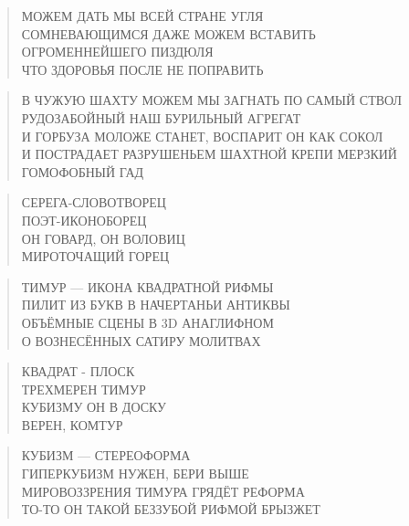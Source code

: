 \poemtitle{***}
\begin{verse}
МОЖЕМ ДАТЬ МЫ ВСЕЙ СТРАНЕ УГЛЯ\\
СОМНЕВАЮЩИМСЯ ДАЖЕ МОЖЕМ ВСТАВИТЬ\\
ОГРОМЕННЕЙШЕГО ПИЗДЮЛЯ\\
ЧТО ЗДОРОВЬЯ ПОСЛЕ НЕ ПОПРАВИТЬ
\end{verse}

\poemtitle{***}
\begin{verse}
В ЧУЖУЮ ШАХТУ МОЖЕМ МЫ ЗАГНАТЬ ПО САМЫЙ СТВОЛ\\
РУДОЗАБОЙНЫЙ НАШ БУРИЛЬНЫЙ АГРЕГАТ\\
И ГОРБУЗА МОЛОЖЕ СТАНЕТ, ВОСПАРИТ ОН КАК СОКОЛ\\
И ПОСТРАДАЕТ РАЗРУШЕНЬЕМ ШАХТНОЙ КРЕПИ МЕРЗКИЙ ГОМОФОБНЫЙ ГАД
\end{verse}

\poemtitle{***}
\begin{verse}
СЕРЕГА-СЛОВОТВОРЕЦ\\
ПОЭТ-ИКОНОБОРЕЦ\\
ОН ГОВАРД, ОН ВОЛОВИЦ\\
МИРОТОЧАЩИЙ ГОРЕЦ
\end{verse}

\poemtitle{***}
\begin{verse}
ТИМУР — ИКОНА КВАДРАТНОЙ РИФМЫ\\
ПИЛИТ ИЗ БУКВ В НАЧЕРТАНЬИ АНТИКВЫ\\
ОБЪЁМНЫЕ СЦЕНЫ В 3D АНАГЛИФНОМ\\
О ВОЗНЕСЁННЫХ САТИРУ МОЛИТВАХ
\end{verse}

\poemtitle{***}
\begin{verse}
КВАДРАТ - ПЛОСК\\
ТРЕХМЕРЕН ТИМУР\\
КУБИЗМУ ОН В ДОСКУ\\
ВЕРЕН, КОМТУР
\end{verse}

\poemtitle{***}
\begin{verse}
КУБИЗМ — СТЕРЕОФОРМА\\
ГИПЕРКУБИЗМ НУЖЕН, БЕРИ ВЫШЕ\\
МИРОВОЗЗРЕНИЯ ТИМУРА ГРЯДЁТ РЕФОРМА\\
ТО-ТО ОН ТАКОЙ БЕЗЗУБОЙ РИФМОЙ БРЫЗЖЕТ
\end{verse}

